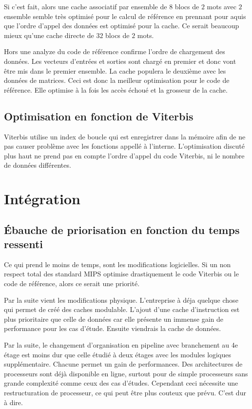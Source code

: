 \documentclass[a11paper]{article}
\begin{document}
Si c'est fait, alors une cache associatif par ensemble de $8$ blocs de $2$ mots
avec $2$ ensemble semble très optimisé pour le calcul de référence en prennant
pour aquis que l'ordre d'appel des données est optimisé pour la cache. Ce
serait beaucoup mieux qu'une cache directe de $32$ blocs de $2$ mots.

Hors une analyze du code de référence confirme l'ordre de chargement des
données. Les vecteurs d'entrées et sorties sont chargé en premier et donc
vont être mis dans le premier ensemble. La cache populera le deuxième avec
les données de matrices. Ceci est donc la meilleur optimisation pour le code de
référence. Elle optimise à la fois les accès échoué et la grosseur de la cache.

\subsection{Optimisation en fonction de Viterbis}
Viterbis utilise un index de boucle qui est enregistrer dans la mémoire afin de
ne pas causer problème avec les fonctions appellé à l'interne. L'optimisation
discuté plus haut ne prend pas en compte l'ordre d'appel du code Viterbis, ni
le nombre de données différentes.

\section{Intégration}

\subsection{Ébauche de priorisation en fonction du temps ressenti}
Ce qui prend le moins de temps, sont les modifications logicielles. Si un non
respect total des standard MIPS optimise drastiquement le code Viterbis ou le
code de référence, alors ce serait une priorité.

Par la suite vient les modifications physique. L'entreprise à déja quelque
chose qui permet de créé des caches modulable. L'ajout d'une cache
d'instruction est plus prioritaire que celle de données car elle présente un
immense gain de performance pour les cas d'étude. Ensuite viendrais la cache
de données.

Par la suite, le changement d'organisation en pipeline avec branchement au 4e
étage est moins dur que celle étudié à deux étages avec les modules logiques
supplémentaire. Chacune permet un gain de performances. Des architectures de
processeurs sont déjà disponible en ligne, surtout pour de simple processeurs
sans grande complexité comme ceux des cas d'études. Cependant ceci nécessite
une restructuration de processeur, ce qui peut être plus couteux que prévu.
C'est dur à dire.
\end{document}
